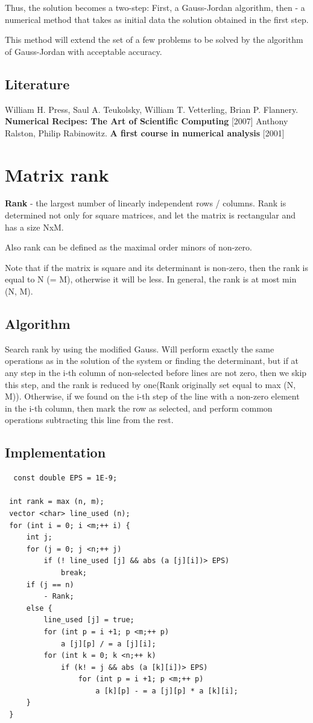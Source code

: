 Thus, the solution becomes a two-step: First, a Gauss-Jordan algorithm, then - a numerical method that takes as initial data the solution obtained in the first step.

This method will extend the set of a few problems to be solved by the algorithm of Gauss-Jordan with acceptable accuracy.

\subsection{ Literature }

William H. Press, Saul A. Teukolsky, William T. Vetterling, Brian P. Flannery. \textbf{Numerical Recipes: The Art of Scientific Computing} [2007]
Anthony Ralston, Philip Rabinowitz. \textbf{A first course in numerical analysis} [2001]

\section{ Matrix rank }
\textbf{Rank} - the largest number of linearly independent rows / columns. Rank is determined not only for square matrices, and let the matrix is ​​rectangular and has a size NxM.

Also rank can be defined as the maximal order minors of non-zero.

Note that if the matrix is ​​square and its determinant is non-zero, then the rank is equal to N (= M), otherwise it will be less. In general, the rank is at most min (N, M).

\subsection{ Algorithm }
Search rank by using the modified Gauss. Will perform exactly the same operations as in the solution of the system or finding the determinant, but if at any step in the i-th column of non-selected before lines are not zero, then we skip this step, and the rank is reduced by one(Rank originally set equal to max (N, M)). Otherwise, if we found on the i-th step of the line with a non-zero element in the i-th column, then mark the row as selected, and perform common operations subtracting this line from the rest.

\subsection{ Implementation } \begin{verbatim}
  const double EPS = 1E-9;

 int rank = max (n, m);
 vector <char> line_used (n);
 for (int i = 0; i <m;++ i) {
     int j;
     for (j = 0; j <n;++ j)
         if (! line_used [j] && abs (a [j][i])> EPS)
             break;
     if (j == n)
         - Rank;
     else {
         line_used [j] = true;
         for (int p = i +1; p <m;++ p)
             a [j][p] / = a [j][i];
         for (int k = 0; k <n;++ k)
             if (k! = j && abs (a [k][i])> EPS)
                 for (int p = i +1; p <m;++ p)
                     a [k][p] - = a [j][p] * a [k][i];
     }
 } 
\end{verbatim}

